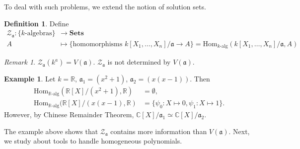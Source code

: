 \documentclass[12pt]{report}
\theoremstyle{plain}
\theoremstyle{remark}
\newtheorem*{remark}{Remark}
\theoremstyle{definition}
\newtheorem{definition}[theorem]{Definition}
\newtheorem{example}[theorem]{Example}
\newcommand{\R}{\mathbb{R}}
\newcommand{\C}{\mathbb{C}}
\newcommand{\Hom}[3]{\mathrm{Hom}_{#3}(#1,#2)}
\begin{document}
To deal with such problems, we extend the notion of solution sets.
\begin{definition}
    Define
    \begin{align*}
        \mathcal{Z}_\mathfrak{a}:\{k\text{-algebras}\} &\to \mathbf{Sets} \\
        A &\mapsto \{\text{homomorphisms }k[X_1,\dots,X_n]/\mathfrak{a}\to A\}=\Hom{k[X_1,\dots,X_n]/\mathfrak{a}}{A}{k\text{-alg}}
    \end{align*}
\end{definition}
\begin{remark}
    $\mathcal{Z}_\mathfrak{a}(k^a)=V(\mathfrak{a})$. $\mathcal{Z}_\mathfrak{a}$ is not determined by $V(\mathfrak{a})$.
\end{remark}

\begin{example}
    Let $k=\R$, $\mathfrak{a}_1=(x^2+1)$, $\mathfrak{a}_2=(x(x-1))$. Then
    \begin{align*}
        \Hom{\R[X]/(x^2+1)}{\R}{\R\text{-alg}} &= \emptyset, \\
        \Hom{\R[X]/(x(x-1)}{\R}{\R\text{-alg}} &= \{\psi_0:X\mapsto 0,\psi_1:X\mapsto 1\}.
    \end{align*}
    However, by Chinese Remainder Theorem, $\C[X]/\mathfrak{a}_1\simeq \C[X]/\mathfrak{a}_2$.
\end{example}

The example above shows that $\mathcal{Z}_\mathfrak{a}$ contains more information than $V(\mathfrak{a})$. Next, we study about tools to handle homogeneous polynomials.
\end{document}
